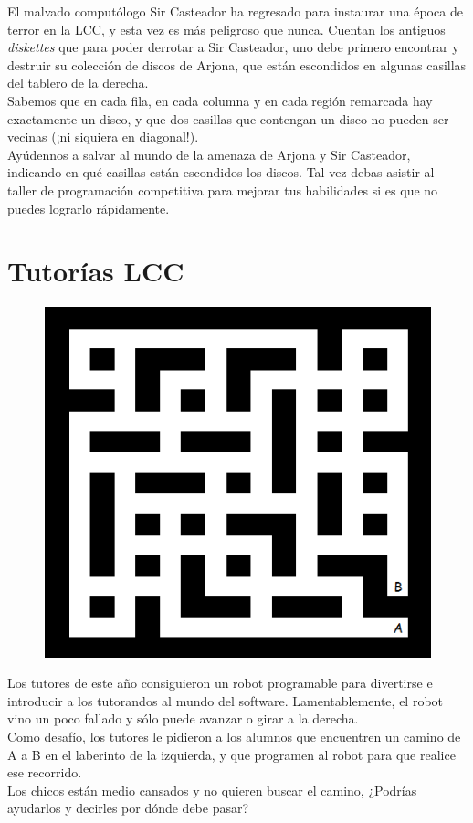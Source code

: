 \documentclass[12pt, a4paper]{article}
\begin{document}
El malvado computólogo Sir Casteador ha regresado para instaurar una
época de terror en la LCC, y esta vez es más peligroso que nunca. Cuentan
los antiguos \emph{diskettes} que para poder derrotar a Sir Casteador, uno
debe primero encontrar y destruir su colección de discos de Arjona,
que están escondidos en algunas casillas del tablero de la derecha. \\
Sabemos que en cada fila, en cada columna y en cada región remarcada hay
exactamente un disco, y que dos casillas que contengan un disco no pueden
ser vecinas (¡ni siquiera en diagonal!). \\
Ayúdennos a salvar al mundo de la amenaza de Arjona y Sir Casteador,
indicando en qué casillas están escondidos los discos. Tal vez debas
asistir al taller de programación competitiva para mejorar tus
habilidades si es que no puedes lograrlo rápidamente.

\section*{Tutorías LCC}
\begin{figure}
\vspace{-1.35em}
\includegraphics[scale=0.4]{res/zoolander}
\end{figure}

Los tutores de este año consiguieron un robot programable para divertirse
e introducir a los tutorandos al mundo del software. Lamentablemente,
el robot vino un poco fallado y sólo puede avanzar o girar a la derecha.\\

Como desafío, los tutores le pidieron a los alumnos que encuentren un
camino de A a B en el laberinto de la izquierda, y que programen al robot
para que realice ese recorrido.\\

Los chicos están medio cansados y no quieren buscar el camino, ¿Podrías
ayudarlos y decirles por dónde debe pasar?

\end{document}
